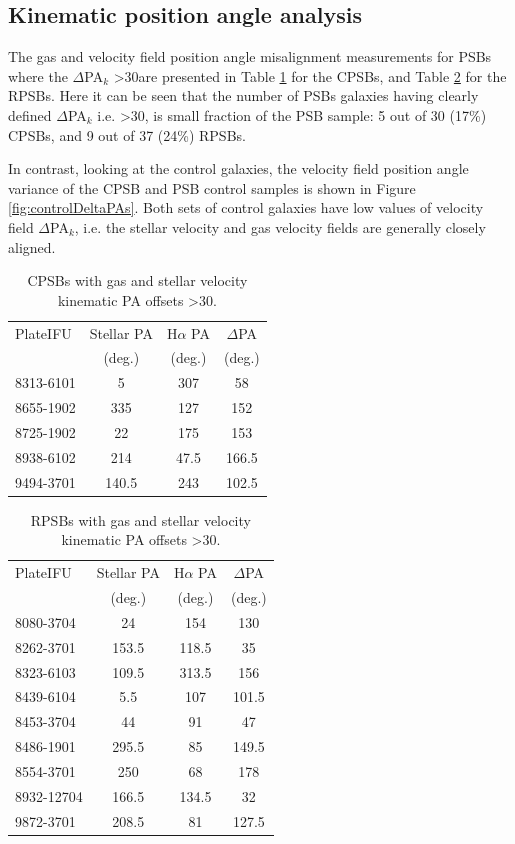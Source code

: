 \subsection{Kinematic position angle analysis}
\label{PA-misalignment}
The gas and velocity field position angle misalignment measurements for PSBs where the $\Delta$PA$_{k}$ \textgreater 30\textdegree are presented in Table \ref{tab:offsetCPSBs} for the CPSBs, and Table \ref{tab:offsetRPSBs} for the RPSBs. Here it can be seen that the number of PSBs galaxies having clearly defined $\Delta$PA$_{k}$ i.e. \textgreater 30\textdegree, is small fraction of the PSB sample: 5 out of 30 (17\%) CPSBs, and 9 out of 37 (24\%) RPSBs. 

In contrast, looking at the control galaxies, the velocity field position angle variance of the CPSB and PSB control samples is shown in Figure \ref{fig:controlDeltaPAs}. Both sets of control galaxies have low values of velocity field $\Delta$PA$_{k}$, i.e. the stellar velocity and gas velocity fields are generally closely aligned.

\begin{table}
\centering
\caption{CPSBs with gas and stellar velocity kinematic PA offsets \textgreater 30\textdegree.}
\label{tab:offsetCPSBs}
\begin{tabular}{lccc}
\hline
PlateIFU  & Stellar PA & H$\alpha$ PA & $\Delta$PA \\
  & (deg.) & (deg.) & (deg.) \\
\hline
8313-6101 & 5 & 307 & 58 \\
8655-1902 & 335 & 127 & 152 \\
8725-1902 & 22 & 175 & 153 \\
8938-6102 & 214 & 47.5 & 166.5 \\
9494-3701 & 140.5 & 243 & 102.5 \\
\hline
\end{tabular}
\end{table}

\begin{table}
\centering
\caption[RPSBs with kinematic velocity PA offsets \textgreater 30\textdegree.]{RPSBs with gas and stellar velocity kinematic PA offsets \textgreater 30\textdegree.}
\label{tab:offsetRPSBs}
\begin{tabular}{lccc}
\hline
PlateIFU   & Stellar PA & H$\alpha$ PA & $\Delta$PA \\
  & (deg.) & (deg.) & (deg.) \\
\hline
8080-3704 & 24 & 154 & 130 \\
8262-3701 & 153.5 & 118.5 & 35 \\
8323-6103 & 109.5 & 313.5 & 156 \\
8439-6104 & 5.5 & 107 & 101.5 \\
8453-3704 & 44 & 91 & 47 \\
8486-1901 & 295.5 & 85 & 149.5 \\
8554-3701 & 250 & 68 & 178 \\
8932-12704 & 166.5 & 134.5 & 32 \\
9872-3701 & 208.5 & 81 & 127.5 \\
\hline
\end{tabular}
\end{table}


